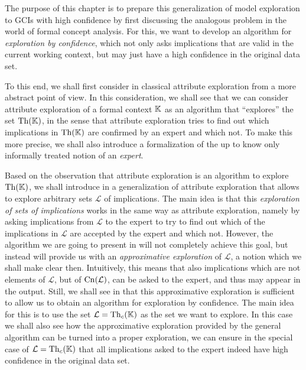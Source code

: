 The purpose of this chapter is to prepare this generalization of model exploration to GCIs
with high confidence by first discussing the analogous problem in the world of formal
concept analysis.  For this, we want to develop an algorithm for \emph{exploration by
  confidence}, which not only asks implications that are valid in the current working
context, but may just have a high confidence in the original data set.

To this end, we shall first consider in  classical attribute
exploration from a more abstract point of view.  In this consideration, we shall see that
we can consider attribute exploration of a formal context ${\mathbb{K}}$ as an algorithm that
\enquote{explores} the set $\operatorname{Th}({\mathbb{K}})$, in the sense that attribute exploration tries to
find out which implications in $\operatorname{Th}({\mathbb{K}})$ are confirmed by an expert and which not.  To
make this more precise, we shall also introduce a formalization of the up to know only
informally treated notion of an \emph{expert}.

Based on the observation that attribute exploration is an algorithm to explore $\operatorname{Th}({\mathbb{K}})$, we shall introduce in  a generalization of attribute
exploration that allows to explore arbitrary sets $\mathcal{L}$ of implications.  The main
idea is that this \emph{exploration of sets of implications} works in the same way as
attribute exploration, namely by asking implications from $\mathcal{L}$ to the expert to
try to find out which of the implications in $\mathcal{L}$ are accepted by the expert and
which not.  However, the algorithm we are going to present in 
will not completely achieve this goal, but instead will provide us with an
\emph{approximative exploration} of $\mathcal{L}$, a notion which we shall make clear
then.  Intuitively, this means that also implications which are not elements of
$\mathcal{L}$, but of $\operatorname{Cn}(\mathcal{L})$, can be asked to the expert, and thus may appear
in the output.  Still, we shall see in  that this approximative
exploration is sufficient to allow us to obtain an algorithm for exploration by
confidence.  The main idea for this is to use the set $\mathcal{L} = \operatorname{Th}_{c}({\mathbb{K}})$ as
the set we want to explore.  In this case we shall also see how the approximative
exploration provided by the general algorithm can be turned into a proper exploration, \ie
we can ensure in the special case of $\mathcal{L} = \operatorname{Th}_{c}({\mathbb{K}})$ that all implications
asked to the expert indeed have high confidence in the original data set.

